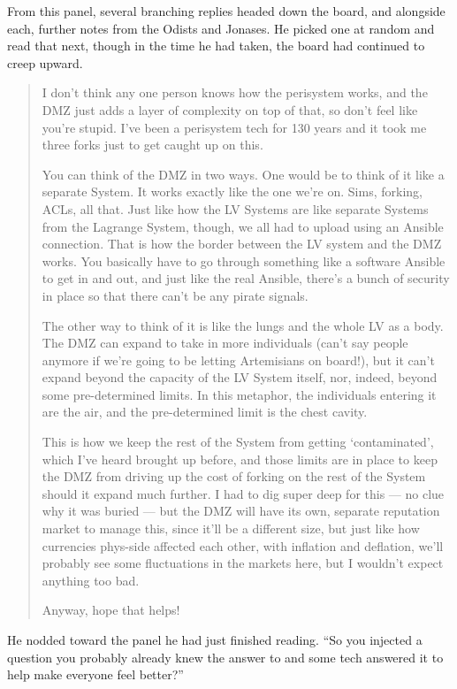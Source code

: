 From this panel, several branching replies headed down the board, and alongside each, further notes from the Odists and Jonases. He picked one at random and read that next, though in the time he had taken, the board had continued to creep upward.

\begin{quote}
I don't think any one person knows how the perisystem works, and the DMZ just adds a layer of complexity on top of that, so don't feel like you're stupid. I've been a perisystem tech for 130 years and it took me three forks just to get caught up on this.

You can think of the DMZ in two ways. One would be to think of it like a separate System. It works exactly like the one we're on. Sims, forking, ACLs, all that. Just like how the LV Systems are like separate Systems from the Lagrange System, though, we all had to upload using an Ansible connection. That is how the border between the LV system and the DMZ works. You basically have to go through something like a software Ansible to get in and out, and just like the real Ansible, there's a bunch of security in place so that there can't be any pirate signals.

The other way to think of it is like the lungs and the whole LV as a body. The DMZ can expand to take in more individuals (can't say people anymore if we're going to be letting Artemisians on board!), but it can't expand beyond the capacity of the LV System itself, nor, indeed, beyond some pre-determined limits. In this metaphor, the individuals entering it are the air, and the pre-determined limit is the chest cavity.

This is how we keep the rest of the System from getting `contaminated', which I've heard brought up before, and those limits are in place to keep the DMZ from driving up the cost of forking on the rest of the System should it expand much further. I had to dig super deep for this — no clue why it was buried — but the DMZ will have its own, separate reputation market to manage this, since it'll be a different size, but just like how currencies phys-side affected each other, with inflation and deflation, we'll probably see some fluctuations in the markets here, but I wouldn't expect anything too bad.

Anyway, hope that helps!
\end{quote}

He nodded toward the panel he had just finished reading. ``So you injected a question you probably already knew the answer to and some tech answered it to help make everyone feel better?''


